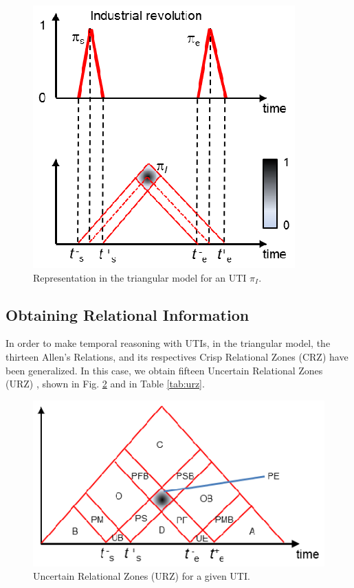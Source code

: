 \begin{figure}[h]
   \centering
   \includegraphics[width=0.8\columnwidth]{graphs/utitm.eps}
   \caption{Representation in the triangular model for an UTI $\pi_I$.  }
   \label{fig:utitm}
 \end{figure}

\subsection{\label{subsec:relational-info-uti}Obtaining Relational Information}
In order to make temporal reasoning with UTIs, in the triangular model, the thirteen Allen's Relations, and its respectives Crisp Relational Zones (CRZ) have been generalized. In this case, we obtain fifteen Uncertain Relational Zones (URZ) , shown in Fig. \ref{fig:urz} and in Table \ref{tab:urz}. 





\begin{figure}[h]
   \centering
   \includegraphics[width=0.8\columnwidth]{graphs/urz.eps}
   \caption{Uncertain Relational Zones (URZ) for a given UTI.  }
   \label{fig:urz}
 \end{figure}



